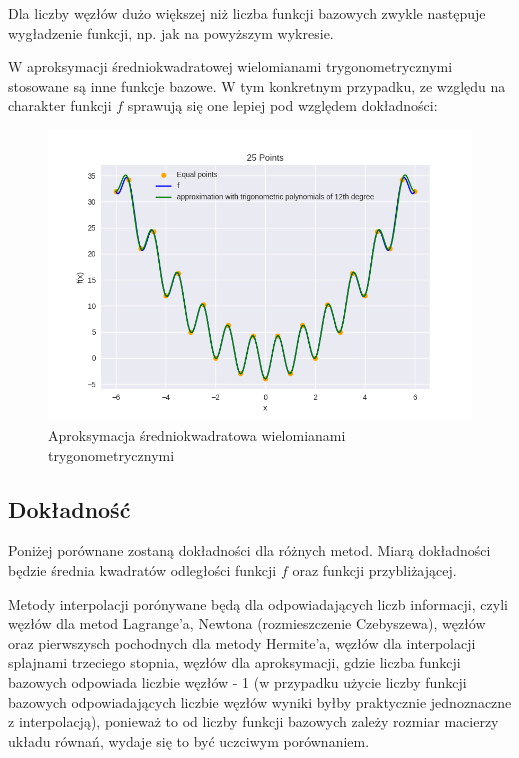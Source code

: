 \documentclass{article}
\begin{document}
Dla liczby węzłów dużo większej niż liczba funkcji bazowych zwykle następuje wygładzenie funkcji, np. jak na powyższym wykresie.

W aproksymacji średniokwadratowej wielomianami trygonometrycznymi stosowane są inne funkcje bazowe.
W tym konkretnym przypadku, ze względu na charakter funkcji $f$ sprawują się one lepiej pod względem dokładności:

\begin{figure}[H]
    \centering
    \includegraphics[width=\textwidth]{img/tripoly_12_25.png}
    \caption{Aproksymacja średniokwadratowa wielomianami trygonometrycznymi}
\end{figure}

\subsection{Dokładność}
Poniżej porównane zostaną dokładności dla różnych metod. Miarą dokładności będzie średnia kwadratów odległości funkcji $f$
oraz funkcji przybliżającej.

Metody interpolacji porónywane będą dla odpowiadających liczb informacji, czyli węzłów dla metod Lagrange'a, Newtona (rozmieszczenie Czebyszewa), 
węzłów oraz pierwszysch pochodnych dla metody Hermite'a, węzłów dla interpolacji splajnami trzeciego stopnia, 
węzłów dla aproksymacji, gdzie liczba funkcji bazowych odpowiada liczbie węzłów - 1 (w przypadku użycie liczby funkcji bazowych odpowiadających
liczbie węzłów wyniki byłby praktycznie jednoznaczne z interpolacją),
ponieważ to od liczby funkcji bazowych zależy rozmiar macierzy układu równań, wydaje się to być uczciwym porównaniem.
\end{document}
